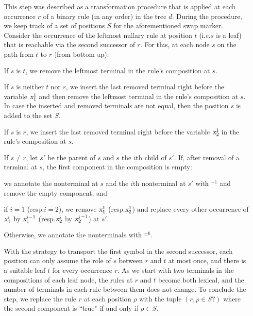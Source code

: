 \documentclass[../../document.tex]{subfiles}
\begin{document}
    This step was described as a transformation procedure that is applied at each occurrence \(r\) of a binary rule (in any order) in the tree \(d\).
    During the procedure, we keep track of a set of positions \(S\) for the aforementioned swap marker.
    Consider the occurrence of the leftmost nullary rule at position \(t\) (i.e.\@ \(s\) is a leaf) that is reachable via the second successor of \(r\).
    For this, at each node \(s\) on the path from \(t\) to \(r\) (from bottom up):
    \begin{compactitem}
        \item If \(s\) is \(t\), we remove the leftmost terminal in the rule's composition at \(s\).
        \item
            If \(s\) is neither \(t\) nor \(r\), we insert the last removed terminal right before the variable \(\textsl{x}^1_1\) and then remove the leftmost terminal in the rule's composition at \(s\).
            In case the inserted and removed terminals are not equal, then the position \(s\) is added to the set \(S\).
        \item If \(s\) is \(r\), we insert the last removed terminal right before the variable \(\textsl{x}^1_2\) in the rule's composition at \(s\).
    \end{compactitem}
    If \(s \neq r\), let \(s'\) be the parent of $s$ and $s$ the \(i\)th child of $s'$.
    If, after removal of a terminal at \(s\), the first component in the composition is empty:
    \begin{compactitem}
        \item we annotate the  nonterminal at \(s\) and the \(i\)th  nonterminal at \(s'\) with $^{-1}$ and remove the empty component, and
        \item if \(i = 1\) (resp.\@ \(i = 2\)), we remove \(\textsl{x}^1_1\) (resp.\@ \(\textsl{x}_2^1\)) and replace every other occurrence of \(\textsl{x}_1^i\) by \(\textsl{x}_1^{i-1}\) (resp.\@ \(\textsl{x}_2^j\) by \(\textsl{x}_2^{j-1}\)) at $s'$.
    \end{compactitem}
    Otherwise, we annotate the nonterminals with \(^{\pm 0}\).

    With the strategy to transport the first symbol in the second successor, each position can only assume the role of \(s\) between \(r\) and \(t\) at most once, and there is a suitable leaf $t$ for every occurrence $r$.
    As we start with two terminals in the compositions of each leaf node, the rules at \(r\) and \(t\) become both lexical, and the number of terminals in each rule between them does not change.
    To conclude the step, we replace the rule \(r\) at each position \(\rho\) with the tuple \((r, \rho \in S?)\) where the second component is ``true'' if and only if \(\rho \in S\).
\end{document}
